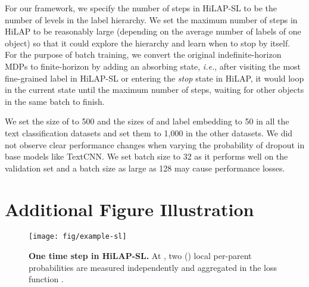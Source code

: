 \documentclass[11pt,a4paper]{article}
\newcommand{\ie}{\textit{i.e.}} \newcommand{\eg}{\textit{e.g.}}
\begin{document}
For our framework, we specify the number of steps in HiLAP-SL to be the number of levels in the label hierarchy.
We set the maximum number of steps in HiLAP to be reasonably large (depending on the average number of labels of one object) so that it could explore the hierarchy and learn when to stop by itself.
For the purpose of batch training, we convert the original indefinite-horizon MDPs to finite-horizon by adding an absorbing state, \ie, after visiting the most fine-grained label in HiLAP-SL or entering the \textit{stop} state in HiLAP, it would loop in the current state until the maximum number of steps, waiting for other objects in the same batch to finish.

We set the size of  to 500 and the sizes of  and label embedding  to 50 in all the text classification datasets and set them to 1,000 in the other datasets.
We did not observe clear performance changes when varying the probability of dropout in base models like TextCNN.
We set batch size to 32 as it performs well on the validation set and a batch size as large as 128 may cause performance losses.


\section{Additional Figure Illustration}

\begin{figure*}[th]
    \centering
    \texttt{[image: fig/example-sl]}
    \vspace{-.3cm}
     \caption{\textbf{One time step in HiLAP-SL.} At , two () local per-parent probabilities  are measured independently and aggregated in the loss function .}
    \label{fig:example-sl}
    \vspace{-.3cm}
\end{figure*}

 
\end{document}
